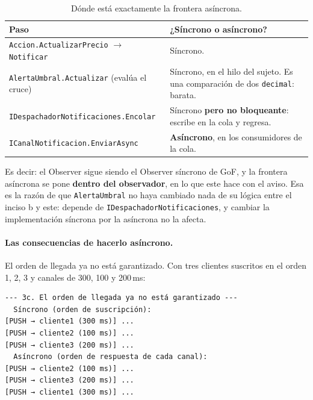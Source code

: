 \begin{table}[H]
\centering
\small
\begin{tabularx}{\textwidth}{>{\raggedright\arraybackslash}p{6.5cm} >{\raggedright\arraybackslash}X}
\toprule
\textbf{Paso} & \textbf{¿Síncrono o asíncrono?} \\
\midrule
\texttt{Accion.ActualizarPrecio} $\rightarrow$ \texttt{Notificar} & Síncrono. \\
\texttt{AlertaUmbral.Actualizar} (evalúa el cruce) & Síncrono, en el hilo del sujeto. Es una comparación de dos \texttt{decimal}: barata. \\
\texttt{IDespachadorNotificaciones.Encolar} & Síncrono \textbf{pero no bloqueante}: escribe en la cola y regresa. \\
\texttt{ICanalNotificacion.EnviarAsync} & \textbf{Asíncrono}, en los consumidores de la cola. \\
\bottomrule
\end{tabularx}
\caption{Dónde está exactamente la frontera asíncrona.}
\end{table}

Es decir: el Observer sigue siendo el Observer síncrono de GoF, y la frontera asíncrona se
pone \textbf{dentro del observador}, en lo que este hace con el aviso. Esa es la razón de
que \texttt{AlertaUmbral} no haya cambiado nada de su lógica entre el inciso b y este:
depende de \texttt{IDespachadorNotificaciones}, y cambiar la implementación síncrona por la
asíncrona no la afecta.

\paragraph{Las consecuencias de hacerlo asíncrono.}
El orden de llegada ya no está garantizado. Con tres clientes suscritos en el orden 1, 2, 3
y canales de 300, 100 y 200\,ms:

\begin{lstlisting}[language={}, numbers=none, basicstyle=\ttfamily\scriptsize, columns=fullflexible, keepspaces=true]
--- 3c. El orden de llegada ya no está garantizado ---
  Síncrono (orden de suscripción):
[PUSH → cliente1 (300 ms)] ...
[PUSH → cliente2 (100 ms)] ...
[PUSH → cliente3 (200 ms)] ...
  Asíncrono (orden de respuesta de cada canal):
[PUSH → cliente2 (100 ms)] ...
[PUSH → cliente3 (200 ms)] ...
[PUSH → cliente1 (300 ms)] ...
\end{lstlisting}

